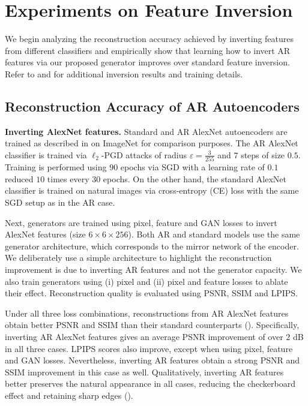 \section{Experiments on Feature Inversion}
\label{sec:experimental}




We begin analyzing the reconstruction accuracy achieved by inverting features from different classifiers and empirically show that learning how to invert AR features via our proposed generator improves over standard feature inversion. Refer to  and  for additional inversion results and training details.

\subsection{Reconstruction Accuracy of AR Autoencoders}
\label{sec:experimental_inverting}
\textbf{Inverting AlexNet features.} Standard and AR AlexNet autoencoders are trained as described in  on ImageNet for comparison purposes. The AR AlexNet classifier is trained via $\ell_{2}$-PGD attacks \cite{madry_2018_towards} of radius $\varepsilon=\frac{3}{255}$ and $7$ steps of size $0.5$. Training is performed using $90$ epochs via SGD with a learning rate of $0.1$ reduced $10$ times every $30$ epochs. On the other hand, the standard AlexNet classifier is trained on natural images via cross-entropy (CE) loss with the same SGD setup as in the AR case.

Next, generators are trained  using pixel, feature and GAN losses to invert AlexNet  features (size $6\times6\times256$). Both AR and standard models use the same generator architecture, which corresponds to the mirror network of the encoder. We deliberately use a simple architecture to highlight the reconstruction improvement is due to inverting AR features and not the generator capacity. We also train generators using (i) pixel and (ii) pixel and feature losses to ablate their effect. Reconstruction quality is evaluated using PSNR, SSIM and LPIPS.

Under all three loss combinations, reconstructions from AR AlexNet features obtain better PSNR and SSIM than their standard counterparts (). Specifically, inverting AR AlexNet features gives an average PSNR improvement of over $2$ dB in all three cases. LPIPS scores also improve, except when using pixel, feature and GAN losses. Nevertheless, inverting AR features obtain a strong PSNR and SSIM improvement in this case as well. Qualitatively, inverting AR features better preserves the natural appearance in all cases, reducing the checkerboard effect and retaining sharp edges ().

